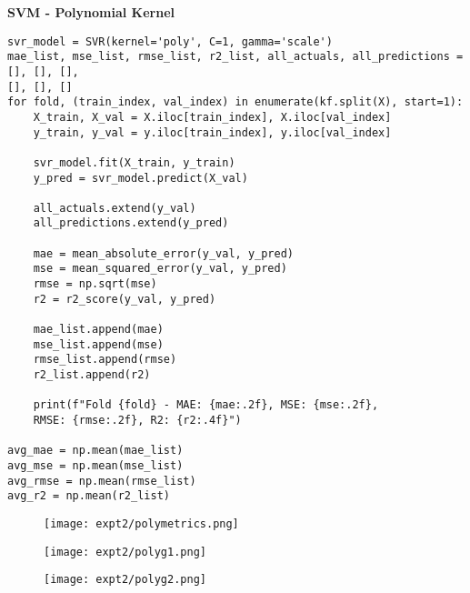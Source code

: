 \documentclass[11pt]{article}
\begin{document}
\vspace{1.7cm}
\textbf{SVM - Polynomial Kernel}
\begin{verbatim}
svr_model = SVR(kernel='poly', C=1, gamma='scale')
mae_list, mse_list, rmse_list, r2_list, all_actuals, all_predictions = [], [], [],
[], [], []
for fold, (train_index, val_index) in enumerate(kf.split(X), start=1):
    X_train, X_val = X.iloc[train_index], X.iloc[val_index]
    y_train, y_val = y.iloc[train_index], y.iloc[val_index]

    svr_model.fit(X_train, y_train)
    y_pred = svr_model.predict(X_val)

    all_actuals.extend(y_val)
    all_predictions.extend(y_pred)

    mae = mean_absolute_error(y_val, y_pred)
    mse = mean_squared_error(y_val, y_pred)
    rmse = np.sqrt(mse)
    r2 = r2_score(y_val, y_pred)

    mae_list.append(mae)
    mse_list.append(mse)
    rmse_list.append(rmse)
    r2_list.append(r2)

    print(f"Fold {fold} - MAE: {mae:.2f}, MSE: {mse:.2f}, 
    RMSE: {rmse:.2f}, R2: {r2:.4f}")

avg_mae = np.mean(mae_list)
avg_mse = np.mean(mse_list)
avg_rmse = np.mean(rmse_list)
avg_r2 = np.mean(r2_list)
\end{verbatim}

\begin{figure}[H]
\centering
\texttt{[image: expt2/polymetrics.png]} 
\end{figure}

\begin{figure}[H]
\centering
\texttt{[image: expt2/polyg1.png]} 
\end{figure}

\begin{figure}[H]
\centering
\texttt{[image: expt2/polyg2.png]} 
\end{figure}
\end{document}
